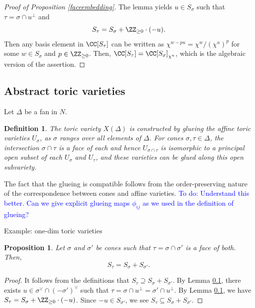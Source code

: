 \documentclass[12pt]{amsart}
\newcommand{\todo}[1]{\noindent  \textcolor{blue}{To do: #1}}
\theoremstyle{plain}
\newtheorem{definition}[theorem]{Definition}
\newtheorem{proposition}[theorem]{Proposition}
\begin{document}
\begin{proof}[Proof of Proposition \ref{faceembedding}]
The lemma yields $u \in S_\sigma$ such that $\tau=\sigma\cap u^\perp$ and
$$S_\tau = S_\sigma + \ZZ_{\ge 0} \cdot (-u).$$
Then any basis element in $\CC[S_\tau]$ can be written as $\chi^{w - p u} = \chi^w / (\chi^u)^p$ for some $w \in S_\sigma$ and $p \in \ZZ_{\ge 0}$.
Then, $\CC[S_\tau] = \CC[S_\sigma]_{\chi^u}$, which is the algebraic version of the assertion.
\end{proof}





\subsection{Abstract toric varieties}
Let $\Delta$ be a fan in $N$.

\begin{definition}
The toric variety $X(\Delta)$ is constructed by glueing the affine toric varieties $U_\sigma$, as $\sigma$ ranges over all elements of $\Delta$.
For cones $\sigma, \tau \in \Delta$, the intersection $\sigma \cap \tau$ is a face of each and hence $U_{\sigma \cap \tau}$ is isomorphic to a principal open subset of each $U_\sigma$ and $U_\tau$, and these varieties can be glued along this open subvariety.
\end{definition}

The fact that the glueing is compatible follows from the order-preserving nature of the correspondence between cones and affine varieties.
\todo{Understand this better. Can we give explicit glueing maps $\phi_{ij}$ as we used in the definition of glueing?}

Example: one-dim toric varieties

\begin{proposition}
Let $\sigma$ and $\sigma'$ be cones such that $\tau = \sigma \cap \sigma'$ is a face of both.
Then,
$$S_\tau = S_\sigma + S_{\sigma'}.$$
\end{proposition}
\begin{proof}
It follows from the definitions that $S_\tau \supseteq S_\sigma + S_{\sigma'}$.
By Lemma \ref{}, there exists $u \in \sigma^\vee \cap (-\sigma')^\vee$ such that $\tau = \sigma \cap u^\perp = \sigma' \cap u^\perp$.
By Lemma \ref{}, we have $S_\tau = S_\sigma + \ZZ_{\ge 0} \cdot (-u)$.
Since $-u \in S_{\sigma'}$, we see $S_\tau \subseteq S_\sigma + S_{\sigma'}.$
\end{proof}
\end{document}
